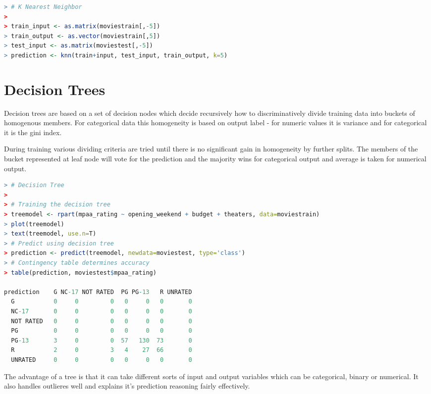 \documentclass{article}
\begin{document}
\begin{spacing}{1.1}
\begin{lstlisting}[language=R]
> # K Nearest Neighbor
> 
> train_input <- as.matrix(moviestrain[,-5])
> train_output <- as.vector(moviestrain[,5])
> test_input <- as.matrix(moviestest[,-5])
> prediction <- knn(train+input, test_input, train_output, k=5)

\end{lstlisting}

\section{Decision Trees}

Decision trees are based on a set of decision nodes which decide recursively how to discriminatively divide training data into buckets of homogenous members.  For categorical data this homogeneity is based on output label - for numeric values it is variance and for categorical it is the gini index.  

\vspace{3mm}

During training various dividing criteria are tried until there is no significant gain in homogeneity by further splits.  The members of the bucket represented at leaf node will vote for the prediction and the majority wins for categorical output and average is taken for numerical output.  

\vspace{3mm}

\begin{lstlisting}[language=R]
> # Decision Tree
> 
> # Training the decision tree
> treemodel <- rpart(mpaa_rating ~ opening_weekend + budget + theaters, data=moviestrain)
> plot(treemodel)
> text(treemodel, use.n=T)
> # Predict using decision tree
> prediction <- predict(treemodel, newdata=moviestest, type='class')
> # Contingency table determines accuracy
> table(prediction, moviestest$mpaa_rating)
           
prediction    G NC-17 NOT RATED  PG PG-13   R UNRATED
  G           0     0         0   0     0   0       0
  NC-17       0     0         0   0     0   0       0
  NOT RATED   0     0         0   0     0   0       0
  PG          0     0         0   0     0   0       0
  PG-13       3     0         0  57   130  73       0
  R           2     0         3   4    27  66       0
  UNRATED     0     0         0   0     0   0       0
\end{lstlisting}

\vspace{3mm}

The advantage of a tree is that it can take different sorts of input and output variables which can be categorical, binary or numerical.  It also handles outlieres well and explains it's prediction reasoning fairly effectively.  


\end{spacing}
\end{document}
